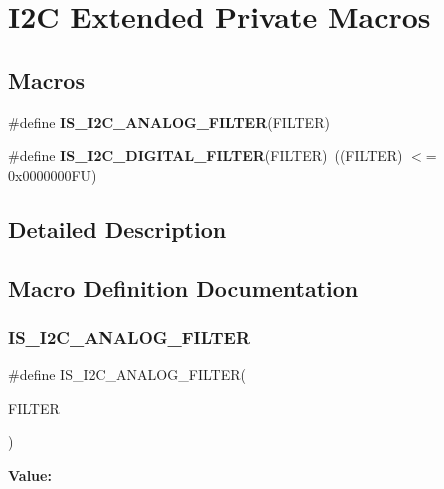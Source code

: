 \hypertarget{group___i2_c_ex___private___macro}{}\section{I2C Extended Private Macros}
\label{group___i2_c_ex___private___macro}
\subsection*{Macros}
\begin{DoxyCompactItemize}
\item 
\#define {\bfseries I\+S\+\_\+\+I2\+C\+\_\+\+A\+N\+A\+L\+O\+G\+\_\+\+F\+I\+L\+T\+ER}(F\+I\+L\+T\+ER)
\item 
\mbox{\label{group___i2_c_ex___private___macro_gac10d26772d885184a7a30d9a2adee453}} 
\#define {\bfseries I\+S\+\_\+\+I2\+C\+\_\+\+D\+I\+G\+I\+T\+A\+L\+\_\+\+F\+I\+L\+T\+ER}(F\+I\+L\+T\+ER)~((F\+I\+L\+T\+ER) $<$= 0x0000000\+F\+U)
\end{DoxyCompactItemize}


\subsection{Detailed Description}


\subsection{Macro Definition Documentation}
\mbox{\label{group___i2_c_ex___private___macro_ga2ca73a919482ef22e5f3bcd5e4a0c820}} 
\subsubsection{\texorpdfstring{IS\_I2C\_ANALOG\_FILTER}{IS\_I2C\_ANALOG\_FILTER}}
{\footnotesize\ttfamily \#define I\+S\+\_\+\+I2\+C\+\_\+\+A\+N\+A\+L\+O\+G\+\_\+\+F\+I\+L\+T\+ER(\begin{DoxyParamCaption}\item[{}]{F\+I\+L\+T\+ER }\end{DoxyParamCaption})}

{\bfseries Value\+:}
\begin{DoxyCode}{0}

\end{DoxyCode}
